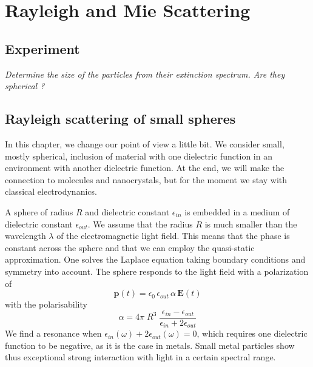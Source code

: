 

\chapter{Rayleigh and Mie Scattering}




\section{Experiment}

\textit{Determine the size of the particles from their extinction spectrum. Are they spherical ?
}


\section{Rayleigh scattering of small spheres}


In this chapter, we change our point of view a little bit. We consider small, mostly spherical, inclusion of material with one dielectric function in an environment with another dielectric function. At the end, we will make the connection to molecules and nanocrystals, but for the moment we stay with classical electrodynanics.


A sphere of radius $R$ and dielectric constant $\epsilon_{in}$ is embedded in a medium of dielectric constant $\epsilon_{out}$. We assume that the radius $R$ is much smaller than the wavelength $\lambda$ of the electromagnetic light field. This means that the phase is constant across the sphere and that we can employ the quasi-static approximation. One solves the Laplace equation taking  boundary conditions and symmetry into account.
The sphere responds to the light field with a polarization of
\[
 \mathbf{p}(t) = \epsilon_0 \,  \epsilon_{out} \, \alpha \, \mathbf{E}(t)
\]
with the polarisability
\[
 \alpha = 4 \pi  \; R^3 \; \frac{\epsilon_{in} - \epsilon_{out}}{\epsilon_{in} + 2 \epsilon_{out}}
\]
We find a resonance when $\epsilon_{in}(\omega) + 2 \epsilon_{out}(\omega) = 0$, which requires one dielectric function to be negative, as it is the case in metals. Small metal particles show thus exceptional strong interaction with light in a certain spectral range.

